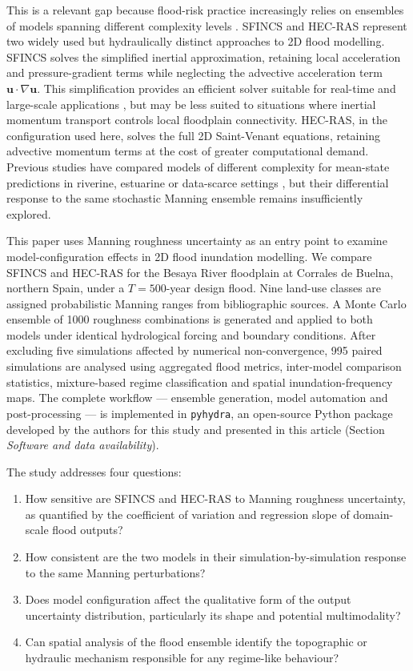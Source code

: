 \documentclass[a4paper,fleqn]{cas-sc}
\newcommand{\sfincs}{\textsc{SFINCS}}
\newcommand{\hecras}{\textsc{HEC-RAS}}
\begin{document}
This is a relevant gap because flood-risk practice increasingly relies on ensembles of models spanning different complexity levels \citep{teng2017,liu2019,shustikova2019}. \sfincs{} \citep{deltares2023sfincs} and \hecras{} \citep{usace2026rasuser,usace2026rastech} represent two widely used but hydraulically distinct approaches to 2D flood modelling. \sfincs{} solves the simplified inertial approximation, retaining local acceleration and pressure-gradient terms while neglecting the advective acceleration term $\mathbf{u}\cdot\nabla\mathbf{u}$. This simplification provides an efficient solver suitable for real-time and large-scale applications \citep{bates2010,neal2018}, but may be less suited to situations where inertial momentum transport controls local floodplain connectivity. \hecras{}, in the configuration used here, solves the full 2D Saint-Venant equations, retaining advective momentum terms at the cost of greater computational demand. Previous studies have compared models of different complexity for mean-state predictions in riverine, estuarine or data-scarce settings \citep{horritt2002,kumbier2019,shustikova2019}, but their differential response to the same stochastic Manning ensemble remains insufficiently explored.

This paper uses Manning roughness uncertainty as an entry point to examine model-configuration effects in 2D flood inundation modelling. We compare \sfincs{} and \hecras{} for the Besaya River floodplain at Corrales de Buelna, northern Spain, under a $T = 500$-year design flood. Nine land-use classes are assigned probabilistic Manning ranges from bibliographic sources. A Monte Carlo ensemble of \num{1000} roughness combinations is generated and applied to both models under identical hydrological forcing and boundary conditions. After excluding five simulations affected by numerical non-convergence, \num{995} paired simulations are analysed using aggregated flood metrics, inter-model comparison statistics, mixture-based regime classification and spatial inundation-frequency maps. The complete workflow --- ensemble generation, model automation and post-processing --- is implemented in \texttt{pyhydra}, an open-source Python package developed by the authors for this study and presented in this article (Section \emph{Software and data availability}).

The study addresses four questions:
\begin{enumerate}
\item How sensitive are \sfincs{} and \hecras{} to Manning roughness uncertainty, as quantified by the coefficient of variation and regression slope of domain-scale flood outputs?
\item How consistent are the two models in their simulation-by-simulation response to the same Manning perturbations?
\item Does model configuration affect the qualitative form of the output uncertainty distribution, particularly its shape and potential multimodality?
\item Can spatial analysis of the flood ensemble identify the topographic or hydraulic mechanism responsible for any regime-like behaviour?
\end{enumerate}
\end{document}
